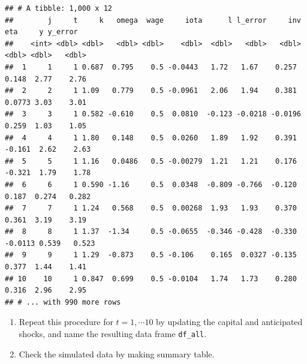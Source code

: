 \documentclass[
]{book}
\begin{document}
\begin{verbatim}
## # A tibble: 1,000 x 12
##        j     t     k   omega  wage     iota      l l_error     inv     eta     y y_error
##    <int> <dbl> <dbl>   <dbl> <dbl>    <dbl>  <dbl>   <dbl>   <dbl>   <dbl> <dbl>   <dbl>
##  1     1     1 0.687  0.795    0.5 -0.0443   1.72   1.67    0.257   0.148  2.77    2.76 
##  2     2     1 1.09   0.779    0.5 -0.0961   2.06   1.94    0.381   0.0773 3.03    3.01 
##  3     3     1 0.582 -0.610    0.5  0.0810  -0.123 -0.0218 -0.0196  0.259  1.03    1.05 
##  4     4     1 1.80   0.148    0.5  0.0260   1.89   1.92    0.391  -0.161  2.62    2.63 
##  5     5     1 1.16   0.0486   0.5 -0.00279  1.21   1.21    0.176  -0.321  1.79    1.78 
##  6     6     1 0.590 -1.16     0.5  0.0348  -0.809 -0.766  -0.120   0.187  0.274   0.282
##  7     7     1 1.24   0.568    0.5  0.00268  1.93   1.93    0.370   0.361  3.19    3.19 
##  8     8     1 1.37  -1.34     0.5 -0.0655  -0.346 -0.428  -0.330  -0.0113 0.539   0.523
##  9     9     1 1.29  -0.873    0.5 -0.106    0.165  0.0327 -0.135   0.377  1.44    1.41 
## 10    10     1 0.847  0.699    0.5 -0.0104   1.74   1.73    0.280   0.316  2.96    2.95 
## # ... with 990 more rows
\end{verbatim}

\begin{enumerate}
\def\labelenumi{\arabic{enumi}.}
\setcounter{enumi}{8}
\item
  Repeat this procedure for \(t = 1, \cdots 10\) by updating the capital and anticipated shocks, and name the resulting data frame \texttt{df\_all}.
\item
  Check the simulated data by making summary table.
\end{enumerate}
\end{document}
